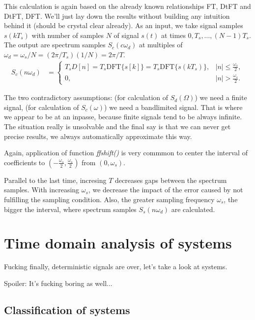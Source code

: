 \documentclass[11pt,a4paper]{report}
\theoremstyle{remark}
\theoremstyle{definition}
\newcommand{\dft}[1]{\mathrm{DFT} \{ #1 \}}
\begin{document}
				This calculation is again based on the already known relationships FT, DtFT and DtFT, DFT. We'll just lay down the results without building any intuition behind it (should be crystal clear already). As an input, we take signal samples $s(kT_s)$ with number of samples $N$ of signal $s(t)$ at times $0, T_s, \dots, (N-1) T_s$. The output are spectrum samples $S_c(c \omega_d)$ at multiples of $\omega_d = \omega_s/N = (2\pi/T_s)(1/N) = 2\pi/T$.
				\begin{align}
					S_c(n \omega_d) &= \left\{ \begin{matrix}
							T_s D[n] = T_s \dft{s[k]} = T_s \dft{s(kT_s)}, & |n| \leq \frac{\omega_s}{2},
						\\
							0, & |n| > \frac{\omega_s}{2}. 
						\end{matrix} \right.
				\end{align}
				
				The two contradictory assumptions: (for calculation of $S_d(\Omega)$) we need a finite signal, (for calculation of $S_c(\omega)$) we need a bandlimited signal. That is where we appear to be at an inpasse, because finite signals tend to be always infinite. The situation really is unsolvable and the final say is that we can never get precise results, we always automatically approximate this way.
				
				Again, application of function \textit{ffshift()} is very commmon to center the interval of coefficients to $(-\frac{\omega_s}{2}, \frac{\omega_s}{2})$ from $(0, \omega_s)$.
				
				Parallel to the last time, incresing $T$ decreases gaps between the spectrum samples. With increasing $\omega_s$, we decrease the impact of the error caused by not fulfilling the sampling condition. Also, the greater sampling frequency $\omega_s$, the bigger the interval, where spectrum samples $S_s(n \omega_d)$ are calculated.
				
				
		
	\chapter{Time domain analysis of systems}
	\epigraph{
		Fucking finally, deterministic signals are over, let's take a look at systems.
	}{Spoiler: It's fucking boring as well...}
		
		\section{Classification of systems}
		
\end{document}
